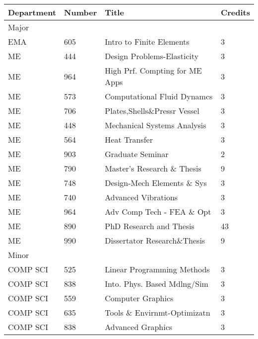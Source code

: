 \documentclass{article}
\begin{document}
\begin{table}[ht!]
\centering
\begin{tabularx}{\textwidth}{llXl}
\toprule
Department & Number & Title                          & Credits \\ \midrule
\multicolumn{4}{l}{Major}                                      \\ \midrule
EMA        & 605    & Intro to Finite Elements       & 3       \\
ME         & 444    & Design Problems-Elasticity     & 3       \\
ME         & 964    & High Prf. Compting for ME Apps & 3       \\
ME         & 573    & Computational Fluid Dynamcs    & 3       \\
ME         & 706    & Plates,Shells\&Pressr Vessel   & 3       \\
ME         & 448    & Mechanical Systems Analysis    & 3       \\
ME         & 564    & Heat Transfer                  & 3       \\
ME         & 903    & Graduate Seminar               & 2       \\
ME         & 790    & Master's Research \& Thesis    & 9       \\
ME         & 748    & Design-Mech Elements \& Sys    & 3       \\
ME         & 740    & Advanced Vibrations            & 3       \\
ME         & 964    & Adv Comp Tech - FEA \& Opt     & 3       \\
ME         & 890    & PhD Research and Thesis        & 43      \\
ME         & 990    & Dissertator Research\&Thesis   & 9       \\ \midrule
\multicolumn{4}{l}{Minor}                                      \\ \midrule
COMP SCI   & 525    & Linear Programming Methods     & 3       \\
COMP SCI   & 838    & Into. Phys. Based Mdlng/Sim    & 3       \\
COMP SCI   & 559    & Computer Graphics              & 3       \\
COMP SCI   & 635    & Tools \& Envirnmt-Optimizatn   & 3       \\
COMP SCI   & 838    & Advanced Graphics              & 3       \\ \bottomrule
\end{tabularx}
\end{table}
\end{document}
